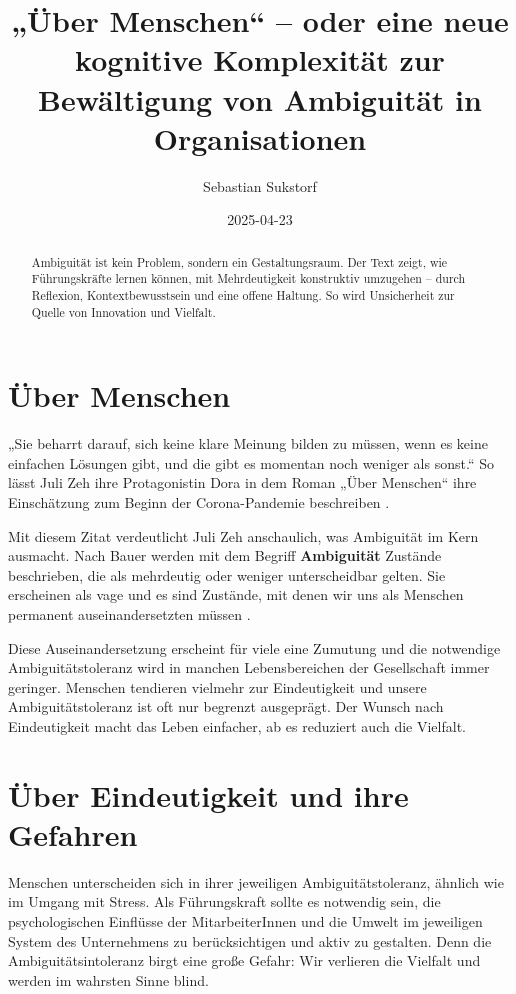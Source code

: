 \documentclass[
  ngerman,
  letterpaper,
  DIV=11]{scrartcl}
\title{„Über Menschen`` -- oder eine neue kognitive Komplexität zur
Bewältigung von Ambiguität in Organisationen}
\author{Sebastian Sukstorf}
\date{2025-04-23}
\renewcommand*\contentsname{Inhaltsverzeichnis}
\newcommand\contentsname{Inhaltsverzeichnis}
\begin{document}
\maketitle
\begin{abstract}
Ambiguität ist kein Problem, sondern ein Gestaltungsraum. Der Text
zeigt, wie Führungskräfte lernen können, mit Mehrdeutigkeit konstruktiv
umzugehen -- durch Reflexion, Kontextbewusstsein und eine offene
Haltung. So wird Unsicherheit zur Quelle von Innovation und Vielfalt.
\end{abstract}

\renewcommand*\contentsname{Inhaltsverzeichnis}
{
\hypersetup{linkcolor=}
\setcounter{tocdepth}{3}
\tableofcontents
}

\section{Über Menschen}\label{uxfcber-menschen}

„Sie beharrt darauf, sich keine klare Meinung bilden zu müssen, wenn es
keine einfachen Lösungen gibt, und die gibt es momentan noch weniger als
sonst.`` So lässt Juli Zeh ihre Protagonistin Dora in dem Roman „Über
Menschen`` ihre Einschätzung zum Beginn der Corona-Pandemie beschreiben
\autocite[28.]{zeh2022}.

Mit diesem Zitat verdeutlicht Juli Zeh anschaulich, was Ambiguität im
Kern ausmacht. Nach Bauer werden mit dem Begriff \textbf{Ambiguität}
Zustände beschrieben, die als mehrdeutig oder weniger unterscheidbar
gelten. Sie erscheinen als vage und es sind Zustände, mit denen wir uns
als Menschen permanent auseinandersetzten müssen
\autocite[13]{bauer2018}.

Diese Auseinandersetzung erscheint für viele eine Zumutung und die
notwendige Ambiguitätstoleranz wird in manchen Lebensbereichen der
Gesellschaft immer geringer. Menschen tendieren vielmehr zur
Eindeutigkeit und unsere Ambiguitätstoleranz ist oft nur begrenzt
ausgeprägt. Der Wunsch nach Eindeutigkeit macht das Leben einfacher, ab
es reduziert auch die Vielfalt.

\section{Über Eindeutigkeit und ihre
Gefahren}\label{uxfcber-eindeutigkeit-und-ihre-gefahren}

Menschen unterscheiden sich in ihrer jeweiligen Ambiguitätstoleranz,
ähnlich wie im Umgang mit Stress. Als Führungskraft sollte es notwendig
sein, die psychologischen Einflüsse der MitarbeiterInnen und die Umwelt
im jeweiligen System des Unternehmens zu berücksichtigen und aktiv zu
gestalten. Denn die Ambiguitätsintoleranz birgt eine große Gefahr: Wir
verlieren die Vielfalt und werden im wahrsten Sinne blind.
\end{document}
